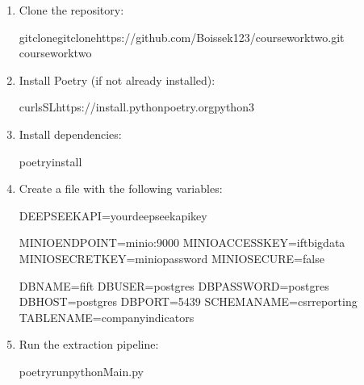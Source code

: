 \documentclass[letterpaper,10pt,english]{sphinxmanual}
\begin{document}
\begin{enumerate}
%
\item {} 
\sphinxAtStartPar
Clone the repository:

\begin{sphinxVerbatim}[commandchars=\\\{\}]
gitclonegitclonehttps://github.com/Boissek123/coursework\PYGZus{}two.git
coursework\PYGZus{}two
\end{sphinxVerbatim}

\item {} 
\sphinxAtStartPar
Install Poetry (if not already installed):

\begin{sphinxVerbatim}[commandchars=\\\{\}]
curl\PYGZhy{}sSLhttps://install.python\PYGZhy{}poetry.orgpython3\PYGZhy{}
\end{sphinxVerbatim}

\item {} 
\sphinxAtStartPar
Install dependencies:

\begin{sphinxVerbatim}[commandchars=\\\{\}]
poetryinstall
\end{sphinxVerbatim}

\item {} 
\sphinxAtStartPar
Create a  file with the following variables:

\begin{sphinxVerbatim}[commandchars=\\\{\}]
DEEPSEEK\PYGZus{}API=your\PYGZus{}deepseek\PYGZus{}api\PYGZus{}key

MINIO\PYGZus{}ENDPOINT=minio:9000
MINIO\PYGZus{}ACCESS\PYGZus{}KEY=ift\PYGZus{}bigdata
MINIO\PYGZus{}SECRET\PYGZus{}KEY=minio\PYGZus{}password
MINIO\PYGZus{}SECURE=false

DB\PYGZus{}NAME=fift
DB\PYGZus{}USER=postgres
DB\PYGZus{}PASSWORD=postgres
DB\PYGZus{}HOST=postgres
DB\PYGZus{}PORT=5439
SCHEMA\PYGZus{}NAME=csr\PYGZus{}reporting
TABLE\PYGZus{}NAME=company\PYGZus{}indicators
\end{sphinxVerbatim}

\item {} 
\sphinxAtStartPar
Run the extraction pipeline:

\begin{sphinxVerbatim}[commandchars=\\\{\}]
poetryrunpythonMain.py
\end{sphinxVerbatim}


\end{enumerate}
\end{document}
